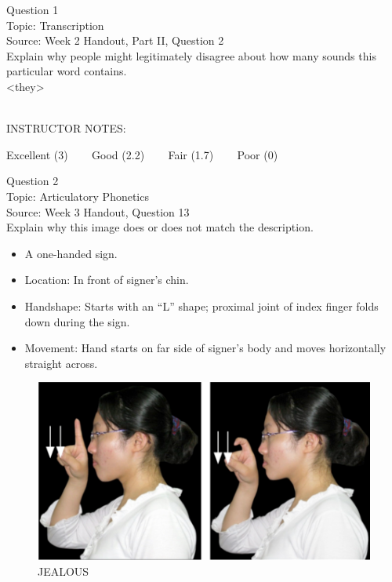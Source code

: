 \documentclass[12pt]{article}
\begin{document}
\begin{center}
\textbf{{\color{blue}{\HUGE START OF EXAM\\}}}

\textbf{{\color{blue}{\HUGE Student ID: 43736\\}}}

\textbf{{\color{blue}{\HUGE \\}}}

\end{center}
\newpage

{\large Question 1}\\

Topic: Transcription\\
Source: Week 2 Handout, Part II, Question 2\\

Explain why people might legitimately disagree about how many sounds this particular word contains.\\

<they>


~\\
INSTRUCTOR NOTES: 


\vfill
Excellent (3) ~~~ Good (2.2) ~~~ Fair (1.7) ~~~ Poor (0)
\newpage

{\large Question 2}\\

Topic: Articulatory Phonetics\\
Source: Week 3 Handout, Question 13\\

Explain why this image does or does not match the description.\\

\begin{itemize} \item A one-handed sign. \item Location: In front of signer’s chin. \item Handshape: Starts with an “L” shape; proximal joint of index finger folds down during the sign. \item Movement: Hand starts on far side of signer’s body and moves horizontally straight across. \end{itemize}

\begin{figure}[H]
\includegraphics{../images/taiwansign_jealous.png}
\caption{JEALOUS}
\end{figure}
\end{document}
